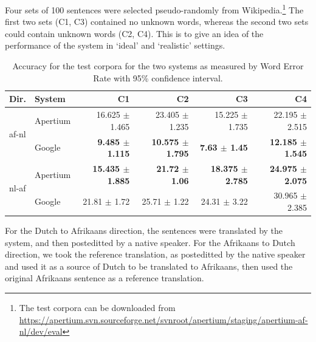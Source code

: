 \documentclass[11pt]{article}
\begin{document}
Four sets of 100 sentences were selected pseudo-randomly from Wikipedia.\footnote{The test corpora can be downloaded
  from \url{https://apertium.svn.sourceforge.net/svnroot/apertium/staging/apertium-af-nl/dev/eval}} The first two sets (C1, C3) contained 
no unknown words, whereas the second two sets could contain unknown words (C2, C4). This is to give an idea
of the performance of the system in `ideal' and `realistic' settings.

\begin{table}
  \begin{center}
  \begin{tabular}{|l|l|r|r|r|r|}
   \hline
   {\bf Dir.} & {\bf System}             & {\bf C1}          & {\bf C2} & {\bf C3} & {\bf C4} \\ 
   \hline
   \multirow{2}{*}{af-nl}  & {\small Apertium}  & 16.625 $\pm$ 1.465 & 23.405 $\pm$ 1.235 & 15.225 $\pm$ 1.735 & 22.195 $\pm$ 2.515 \\ 
                           & {\small Google}  & {\bf 9.485 $\pm$ 1.115} & {\bf 10.575 $\pm$ 1.795} & {\bf 7.63 $\pm$ 1.45} & {\bf 12.185 $\pm$ 1.545} \\ 
   \hline
    \multirow{2}{*}{nl-af} & {\small Apertium }  & {\bf 15.435 $\pm$ 1.885}  & {\bf 21.72 $\pm$ 1.06} & {\bf 18.375 $\pm$ 2.785} & {\bf 24.975 $\pm$ 2.075} \\
                           & {\small Google }  & 21.81 $\pm$ 1.72& 	25.71 $\pm$ 1.22&	24.31 $\pm$ 3.22&	30.965 $\pm$ 2.385 \\ 

   \hline
  \end{tabular}
    \caption{Accuracy for the test corpora for the two systems as measured by Word Error Rate 
        with 95\% confidence interval.}
    \label{table:quan}
  \end{center}
\end{table}

For the Dutch to Afrikaans direction, the sentences were translated by the system, and then
posteditted by a native speaker. For the Afrikaans to Dutch direction, we took the reference 
translation, as posteditted by the native speaker and used it as a source of Dutch to be translated
to Afrikaans, then used the original Afrikaans sentence as a reference translation.

\end{document}
